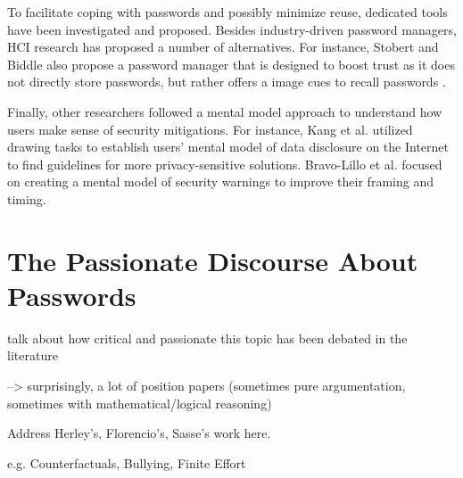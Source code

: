 	To facilitate coping with passwords and possibly minimize reuse, dedicated tools have been investigated and proposed. Besides industry-driven password managers, HCI research has proposed a number of alternatives. For instance, Stobert and Biddle also propose a password manager that is designed to boost trust as it does not directly store passwords, but rather offers a image cues to recall passwords \cite{Stobert2014Versipass}. 
	
	Finally, other researchers followed a mental model approach to understand how users make sense of security mitigations. For instance, Kang et al. utilized drawing tasks to establish users' mental model of data disclosure on the Internet \cite{Kang2015MentalModelsDrawing} to find guidelines for more privacy-sensitive solutions. Bravo-Lillo et al. focused on creating a mental model of security warnings \cite{BravoLillo2011WarningsMentalModel} to improve their framing and timing.
	
	
\section{The Passionate Discourse About Passwords}\label{sec:rw:passionate_discourse}
talk about how critical and passionate this topic has been debated in the literature

--> surprisingly, a lot of position papers (sometimes pure argumentation, sometimes with mathematical/logical reasoning) 

Address Herley's, Florencio's, Sasse's work here. 

e.g. Counterfactuals, Bullying, Finite Effort 
